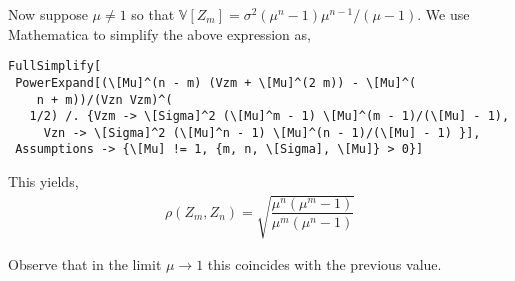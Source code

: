 \documentclass[10pt]{article}
\begin{document}
\begin{solution}[Solution]
Now suppose \( \mu\neq 1 \) so that \( \mathbb{V}[Z_m] = \sigma^2(\mu^n-1)\mu^{n-1}/(\mu-1) \). We use Mathematica to simplify the above expression as,
\begin{lstlisting}
FullSimplify[
 PowerExpand[(\[Mu]^(n - m) (Vzm + \[Mu]^(2 m)) - \[Mu]^(
    n + m))/(Vzn Vzm)^(
   1/2) /. {Vzm -> \[Sigma]^2 (\[Mu]^m - 1) \[Mu]^(m - 1)/(\[Mu] - 1),
     Vzn -> \[Sigma]^2 (\[Mu]^n - 1) \[Mu]^(n - 1)/(\[Mu] - 1) }], 
 Assumptions -> {\[Mu] != 1, {m, n, \[Sigma], \[Mu]} > 0}]
\end{lstlisting}

This yields,
\begin{align*}
    \rho(Z_m,Z_n) = \sqrt{\dfrac{\mu^n(\mu^m-1)}{\mu^m(\mu^n-1)}}
\end{align*}

Observe that in the limit \( \mu\to 1 \) this coincides with the previous value.

\iffalse
\begin{align*}
    \rho(Z_m,Z_n) &= \dfrac{\operatorname{Cov}(Z_n,Z_m)}{(\mathbb{V}[Z_n] \mathbb{V}[Z_m])^{1/2}} \\
    &= \dfrac{\EE[Z_nZ_m]-\EE[Z_n]\EE[Z_m]}{(n\sigma^2m\sigma^2)^{1/2}} \\
    &= \dfrac{\mu^{(n-m)/2}}{\sigma}\sqrt{\dfrac{\mu^m-1}{\mu^n-1}}
\end{align*}
\fi

\iffalse 
Clearly \( Z_n = \sum_{i=1}^{Z_m}Y_{m,i}  \). Then,
\begin{align*}
    \EE[Z_nZ_m] &= \EE\EE \left[ Z_m (Y_{m,1} + Y_{m,2} +...+Y_{m,Z_m} ) \big| Z_m \right] \\
    &= \EE\EE\left[ Z_mY_{m,1}+Z_mY_{m,2}+...+Z_mY_{m,Z_m}\big| Z_m \right] \\
    &= \EE \left[ Z_m \EE[Z_m Z_{n-m}|Z_m]  \right] \\
    &= \EE \left[ Z_m^2 \EE[Z_{n-m}|Z_m]\right] \\
    &= \EE \left[Z_m^2  \mu^{n-m} ] \\
    &= \mu^{n-m}\EE\left[Z_m^2\right]
\end{align*}

Then this is the sum of iid random variables so,
\begin{align*}
    
\end{align*}
\fi
\end{solution}

\begin{problem}[Exercise 3.3]

\end{problem}
\end{document}
